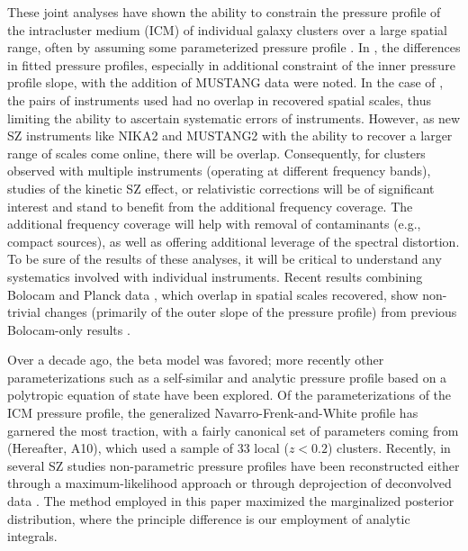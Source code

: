 \documentclass[onecolumn,traditabstract]{aa}
\begin{document}
These joint analyses have shown the ability to constrain the pressure profile of the intracluster medium (ICM) of individual
galaxy clusters over a large spatial range, often by assuming some parameterized pressure profile \citep[e.g.,][]{romero2017,adam2014}.
In \citet{romero2015a}, the differences in fitted pressure profiles, especially in additional constraint of the inner pressure profile
slope, with the addition of MUSTANG data were noted. In the case of
\citet{romero2017,adam2015,adam2016a}, the pairs of instruments used had no overlap in recovered spatial scales, thus
limiting the ability to ascertain systematic errors of instruments.
However, as new SZ instruments like NIKA2 \citep[][]{monfardini2014,calvo2016} and MUSTANG2 \citep[][]{dicker2014a}
with the ability to recover a larger range of scales come online, there will be overlap. Consequently, for clusters observed
with multiple instruments (operating at different frequency bands), studies of the kinetic SZ effect, or relativistic
corrections \citep{itoh1998} will be of significant interest and stand to benefit from the additional frequency coverage.
The additional frequency coverage will help with removal of contaminants (e.g., compact sources), as well as offering additional
leverage of the spectral distortion. 
To be sure of the results of these analyses, it will be critical to
understand any systematics involved with individual instruments. Recent results combining Bolocam and Planck data \citep{sayers2016},
which overlap in spatial scales recovered, show non-trivial changes (primarily of the outer slope of the pressure profile)
from previous Bolocam-only results \citep{sayers2013}.

Over a decade ago, the beta model
\citep{cavaliere1978} was favored; more recently other parameterizations such as a self-similar \citep{mroczkowski2009} and
analytic pressure profile based on a polytropic equation of state \citep{bulbul2010} have been explored. Of the parameterizations
of the ICM pressure profile, the generalized Navarro-Frenk-and-White \citep[gNFW][]{nagai2007} profile has garnered the most traction,
with a fairly canonical set of parameters coming from \citet{arnaud2010} (Hereafter, A10), which used a sample of 33 local ($z < 0.2$)
clusters.
Recently, in several SZ studies non-parametric pressure profiles have been reconstructed either through a maximum-likelihood approach
\citep[e.g.,][]{ruppin2017,sayers2013} or through deprojection of deconvolved data  \citep[e.g.,][]{basu2010,sayers2011}.
The method employed in this
paper maximized the marginalized posterior distribution, where the principle difference is our employment of analytic integrals.
\end{document}
